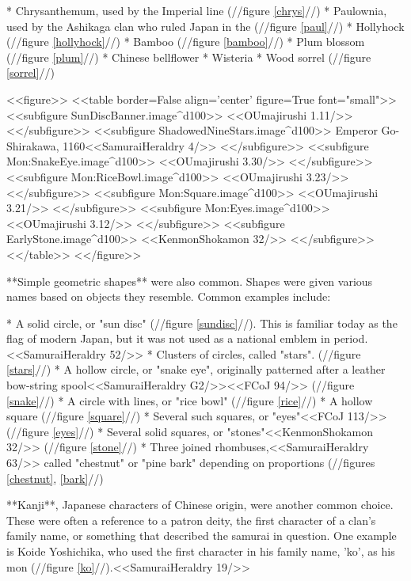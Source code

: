  * Chrysanthemum, used by the Imperial line (//figure \ref{chrys}//)
  * Paulownia, used by the Ashikaga clan who ruled Japan in the \MuromachiPeriod (//figure \ref{paul}//)
  * Hollyhock (//figure \ref{hollyhock}//)
  * Bamboo (//figure \ref{bamboo}//)
  * Plum blossom (//figure \ref{plum}//)
  * Chinese bellflower
  * Wisteria
  * Wood sorrel (//figure \ref{sorrel}//)

  <<figure>>
  <<table border=False align='center' figure=True font="small">>
  <<subfigure SunDiscBanner.image^d100>>
    \label{sundisc}<<OUmajirushi 1.11/>>
  <</subfigure>>
  <<subfigure ShadowedNineStars.image^d100>>
    \label{stars} Emperor Go-Shirakawa, 1160<<SamuraiHeraldry 4/>>
  <</subfigure>>
  <<subfigure Mon:SnakeEye.image^d100>>
    \label{snake}<<OUmajirushi 3.30/>>
  <</subfigure>>
  <<subfigure Mon:RiceBowl.image^d100>>
    \label{rice}<<OUmajirushi 3.23/>>
  <</subfigure>>
  <<subfigure Mon:Square.image^d100>>
    \label{square}<<OUmajirushi 3.21/>>
  <</subfigure>>
  <<subfigure Mon:Eyes.image^d100>>
    \label{eyes}<<OUmajirushi 3.12/>>
  <</subfigure>>
  <<subfigure EarlyStone.image^d100>>
    \label{stone}<<KenmonShokamon 32/>>
  <</subfigure>>
  <</table>>
  <</figure>>

  **Simple geometric shapes** were also common.  Shapes were given
  various names based on objects they resemble.  Common examples
  include:

  * A solid circle, or "sun disc" (//figure
  \ref{sundisc}//).  This is familiar today as the flag of modern Japan,
  but it was not used as a national emblem in period.<<SamuraiHeraldry
  52/>>
  * Clusters of circles, called "stars". (//figure \ref{stars}//)
  * A hollow circle, or "snake eye", originally patterned after a leather
  bow-string spool<<SamuraiHeraldry G2/>><<FCoJ 94/>> (//figure \ref{snake}//)
  * A circle with lines, or "rice bowl" (//figure \ref{rice}//)
  * A hollow square (//figure \ref{square}//)
  * Several such squares, or "eyes"<<FCoJ 113/>> (//figure \ref{eyes}//)
  * Several solid squares, or "stones"<<KenmonShokamon 32/>> (//figure \ref{stone}//)
  * Three joined rhombuses,<<SamuraiHeraldry 63/>> called "chestnut" or "pine bark" depending on proportions (//figures \ref{chestnut}, \ref{bark}//)

  **Kanji**, Japanese characters of Chinese origin, were another
  common choice.  These were often a reference to a patron deity, the
  first character of a clan's family name, or something that described
  the samurai in question.  One example is Koide Yoshichika, who used
  the first character in his family name, 'ko', as his mon (//figure
  \ref{ko}//).<<SamuraiHeraldry 19/>>

